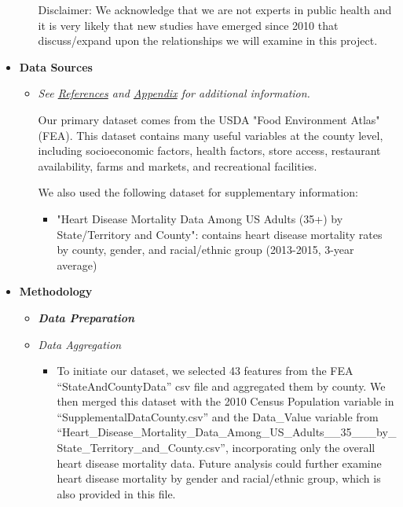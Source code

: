 \documentclass{article}
\begin{document}
\begin{itemize}[leftmargin=0pt]
\begin{itemize}
    Disclaimer: We acknowledge that we are not experts in public health and it is very likely that new studies have emerged since 2010 that discuss/expand upon the relationships we will examine in this project.
\end{itemize}

\item[] \textbf{Data Sources}
\begin{itemize}
    \item \textit{See \hyperref[ref:bib]{References} and \hyperref[ref:fea]{Appendix} for additional information.}

    Our primary dataset comes from the USDA "Food Environment Atlas" (FEA)\cite{usda_food_environment_atlas}. This dataset contains many useful variables at the county level, including socioeconomic factors, health factors, store access, restaurant availability, farms and markets, and recreational facilities.

    We also used the following dataset for supplementary information:
    \begin{itemize}
        \item[] "Heart Disease Mortality Data Among US Adults (35+) by State/Territory and County": contains heart disease mortality rates by county, gender, and racial/ethnic group (2013-2015, 3-year average)\cite{heart_disease_mortality_data}
    \end{itemize}
\end{itemize}



\item[] \textbf{Methodology}
\begin{itemize}
\item[] \textbf{\textit{Data Preparation}} 

\item[] \textit{Data Aggregation}
\begin{itemize}
\item[] To initiate our dataset, we selected 43 features from the FEA “StateAndCountyData” csv file and aggregated them by county. We then merged this dataset with the 2010 Census Population variable in “SupplementalDataCounty.csv” and the Data\_Value variable from \\“Heart\_Disease\_Mortality\_Data\_Among\_US\_Adults\_\_35\_\_\_by\_State\_Territory\_and\_County.csv”, incorporating only the overall heart disease mortality data. Future analysis could further examine heart disease mortality by gender and racial/ethnic group, which is also provided in this file. 
\end{itemize}


\end{itemize}
\end{itemize}
\end{document}
